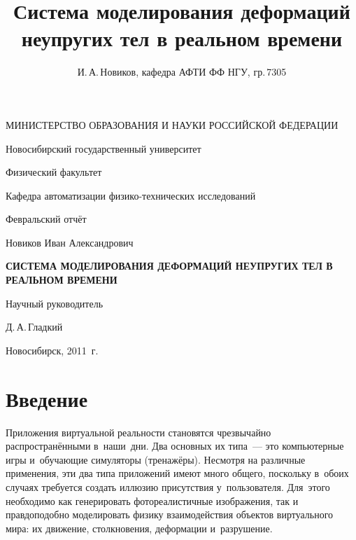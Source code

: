 \documentclass[a4paper, 14pt, titlepage]{extarticle}
\author{И.\,А.\,Новиков, кафедра АФТИ ФФ НГУ, гр.\,7305}
\title{Система моделирования деформаций неупругих тел в реальном времени}
\begin{document}

  \thispagestyle{empty}
  \begin {center}
  МИНИСТЕРСТВО ОБРАЗОВАНИЯ И НАУКИ РОССИЙСКОЙ ФЕДЕРАЦИИ

  \vspace{0.3cm}

  Новосибирский государственный университет

  \vspace{0.3cm}

  Физический факультет

  Кафедра автоматизации физико-технических исследований

  \vspace {5cm}

  Февральский отчёт

  \vspace {1cm}

  Новиков Иван Александрович

  \vspace {0.5cm}

  \textbf{СИСТЕМА МОДЕЛИРОВАНИЯ ДЕФОРМАЦИЙ НЕУПРУГИХ ТЕЛ В РЕАЛЬНОМ ВРЕМЕНИ}

  \vspace {2cm}

  \begin{flushright}

    Научный руководитель

    Д.\,А.\,Гладкий

  \end{flushright}

  \vspace {5cm}

  Новосибирск, 2011~г.
  \end {center}


  \tableofcontents
  \newpage

  \section{Введение}

    Приложения виртуальной реальности становятся чрезвычайно рас\-прос\-тра\-нён\-ны\-ми в~наши~дни.  Два
    основных их типа~--- это компьютерные игры и~обучающие симуляторы (тренажёры). Несмотря на
    различные применения, эти два типа приложений имеют много общего, поскольку в~обоих случаях
    требуется создать иллюзию присутствия у~пользователя. Для~этого необходимо как генерировать
    фотореалистичные изображения, так и правдоподобно моделировать физику взаимодействия объектов
    виртуального мира: их движение, столкновения, деформации и~разрушение.
\end{document}
